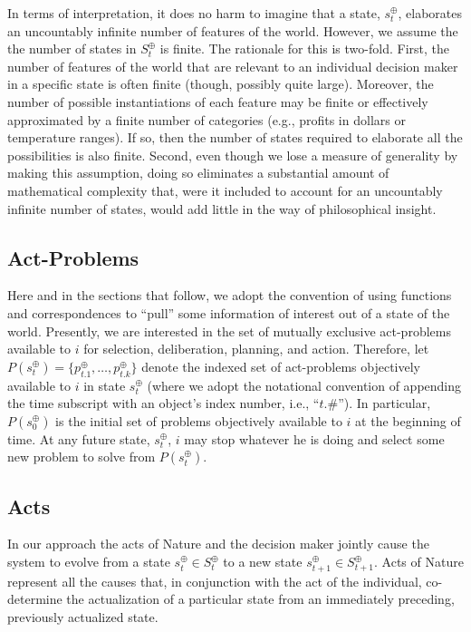 \documentclass[
11pt,
titlepage,
reqno,
]{article}%
\theoremstyle{definition}
\begin{document}
In terms of interpretation, it does no harm to imagine that a state, $s^\oplus_t$, elaborates an uncountably infinite number of features of the world.
However,  we assume the the number of states in $S^\oplus_t$ is finite.
The rationale for this is two-fold.
First, the number of features of the world that are relevant to an individual decision maker in a specific state is often finite (though, possibly quite large).
Moreover, the number of possible instantiations of each feature may be finite or effectively approximated by a finite number of  categories (e.g., profits in dollars or temperature ranges).
If so, then the number of states required to elaborate all the possibilities is also finite.
Second, even  though we lose a measure of generality by making this assumption, doing so eliminates a substantial amount of mathematical complexity that, were it included to account for an uncountably infinite number of states, would add little in the way of philosophical insight.

\subsection{Act-Problems}\label{sec:problems}
Here and in the sections that follow, we adopt the convention of using functions and correspondences to ``pull'' some information of interest out of a state of the world. 
Presently, we are interested in the set of mutually exclusive act-problems available to $i$ for selection, deliberation, planning, and action.
Therefore, let $P(s^\oplus_t)=\{p^\oplus_{t.1},\ldots,p^\oplus_{t.k}\}$ denote the indexed set of act-problems objectively available to $i$ in state $s^\oplus_t$ (where we adopt the notational convention of appending the time subscript with an object's index number, i.e., ``$t.\#$'').
In particular, $P(s^\oplus_0)$ is the initial set of problems objectively available to $i$ at the beginning of time. 
At any future state, $s^\oplus_t$, $i$ may stop whatever he is doing and select some new problem to solve from $P(s^\oplus_t)$. 


\subsection{Acts}\label{sec:acts}

In our approach the acts of Nature and the decision maker jointly cause the system to evolve from a state $s^\oplus_t\in S^\oplus_t$ to a new state $s^\oplus_{t+1}\in S^\oplus_{t+1}$.
Acts of Nature represent all the causes that, in conjunction with the act of the individual, co-determine the actualization of a particular state from an immediately preceding, previously actualized state.
\end{document}
